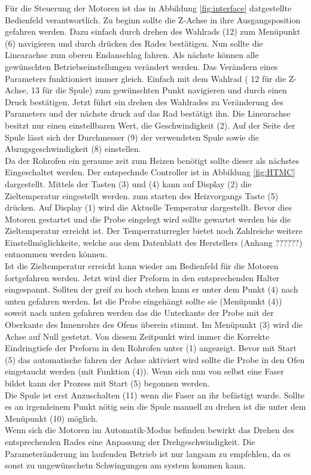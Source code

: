Für die Steuerung der Motoren ist das in Abbildung \ref{fig:interface} datgestellte Bedienfeld verantwortlich. Zu beginn sollte die Z-Achse in ihre Ausgangsposition gefahren werden. Dazu einfach durch drehen des Wahlrads (12) zum Menüpunkt (6) navigieren und durch drücken des Rades bestätigen. Nun sollte die Linearachse zum oberen Endanschlag fahren. Als nächste können alle gewünschten Betriebseinstellungen verändert werden. Das Verändern eines Parameters funktioniert immer gleich. Einfach mit dem Wahlrad ( 12 für die Z-Achse, 13 für die Spule) zum gewünschten Punkt navigieren und durch einen Druck bestätigen. Jetzt führt ein  drehen des Wahlrades zu Veränderung des Parameters und der nächste druck auf das Rad bestätigt ihn. Die Linearachse besitzt nur einen einstellbaren Wert, die Geschwindigkeit (2). Auf der Seite der Spule lässt sich der Durchmesser (9) der verwendeten Spule sowie die Abzugsgeschwindigkeit (8) einstellen.\\
Da der Rohrofen ein geraume zeit zum Heizen benötigt sollte dieser als nächstes Eingeschaltet werden. Der entspechnde Controller ist in Abbildung \ref{fig:HTMC} dargestellt. Mittels der Tasten (3) und (4) kann auf Display (2) die Zieltemperatur eingestellt werden. zum starten des Heizvorgangs Taste (5) drücken. Auf Display (1) wird die Aktuelle Temperatur dargestellt. Bevor dies Motoren gestartet und die Probe eingelegt wird sollte gewartet werden bis die Zieltemperatur erreicht ist. Der Temperraturregler bietet noch Zahlreiche weitere Einstellmöglichkeite, welche aus dem Datenblatt des Herstellers (Anhang ??????) entnommen werden können. \\
Ist die Zieltemperatur erreicht kann wieder am Bedienfeld für die Motoren fortgefahren werden. Jetzt wird dier Preform in den entsprechenden Halter eingespannt. Sollten der greif zu hoch stehen kann er unter dem Punkt (4) nach unten gefahren werden. Ist die Probe eingehängt sollte sie (Menüpunkt (4)) soweit nach unten gefahren werden das die Unterkante der Probe mit der Oberkante des Innenrohrs des Ofens  überein stimmt. Im Menüpunkt (3) wird die Achse auf Null gestetzt. Von diesem Zeitpunkt wird immer die Korrekte Eindringtiefe der Preform in den Rohrofen unter (1) angezeigt. Bevor mit Start (5) das automatische fahren der Achse aktiviert wird sollte die Probe in den Ofen eingetaucht werden (mit Funktion (4)).
Wenn sich nun von selbst eine Faser bildet kann der Prozess mit Start (5) begonnen werden.\\
Die Spule ist erst Anzuschalten (11) wenn die Faser an ihr befästigt wurde. Sollte es an irgendeinem Punkt nötig sein die Spule manuell zu drehen ist die unter dem Menüpunkt (10) möglich.\\
Wenn sich die Motoren im Automatik-Modus befinden bewirkt das Drehen des entsprechenden Rades eine Anpassung der Drehgeschwindigkeit. Die Parameteränderung im laufenden Betrieb ist nur langsam zu empfehlen, da es sonst zu ungewünschetn Schwingungen am system kommen kann. 

